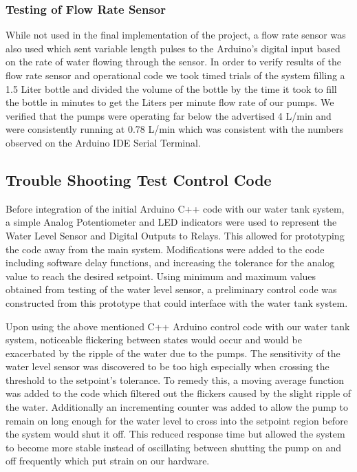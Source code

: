 \documentclass[../main.tex]{subfiles}
\begin{document}
\subsubsection{Testing of Flow Rate Sensor}
While not used in the final implementation of the project, a flow rate sensor was also used which sent variable length pulses to the Arduino’s digital input based on the rate of water flowing through the sensor. In order to verify results of the flow rate sensor and operational code we took timed trials of the system filling a 1.5 Liter bottle and divided the volume of the bottle by the time it took to fill the bottle in minutes to get the Liters per minute flow rate of our pumps. We verified that the pumps were operating far below the advertised 4 L/min and were consistently running at 0.78 L/min which was consistent with the numbers observed on the Arduino IDE Serial Terminal.



\subsection{Trouble Shooting Test Control Code}
Before integration of the initial Arduino C++ code with our water tank system, a simple Analog Potentiometer and LED indicators were used to represent the Water Level Sensor and Digital Outputs to Relays. This allowed for prototyping the code away from the main system. Modifications were added to the code including software delay functions, and increasing the tolerance for the analog value to reach the desired setpoint. Using minimum and maximum values obtained from testing of the water level sensor, a preliminary control code was constructed from this prototype that could interface with the water tank system.

Upon using the above mentioned C++ Arduino control code with our water tank system, noticeable flickering between states would occur and would be exacerbated by the ripple of the water due to the pumps. The sensitivity of the water level sensor was discovered to be too high especially when crossing the threshold to the setpoint’s tolerance. To remedy this, a moving average function was added to the code which filtered out the flickers caused by the slight ripple of the water. Additionally an incrementing counter was added to allow the pump to remain on long enough for the water level to cross into the setpoint region before the system would shut it off. This reduced response time but allowed the system to become more stable instead of oscillating between shutting the pump on and off frequently which put strain on our hardware.
\end{document}
